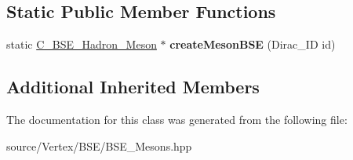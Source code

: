 \subsection*{Static Public Member Functions}
\begin{DoxyCompactItemize}
\item 
\hypertarget{class_c___b_s_e___hadron___meson_a17fb6d15d60543e1481c022b57c57251}{static \hyperlink{class_c___b_s_e___hadron___meson}{C\-\_\-\-B\-S\-E\-\_\-\-Hadron\-\_\-\-Meson} $\ast$ {\bfseries create\-Meson\-B\-S\-E} (Dirac\-\_\-\-I\-D id)}\label{class_c___b_s_e___hadron___meson_a17fb6d15d60543e1481c022b57c57251}

\end{DoxyCompactItemize}
\subsection*{Additional Inherited Members}


The documentation for this class was generated from the following file\-:\begin{DoxyCompactItemize}
\item 
source/\-Vertex/\-B\-S\-E/B\-S\-E\-\_\-\-Mesons.\-hpp\end{DoxyCompactItemize}
